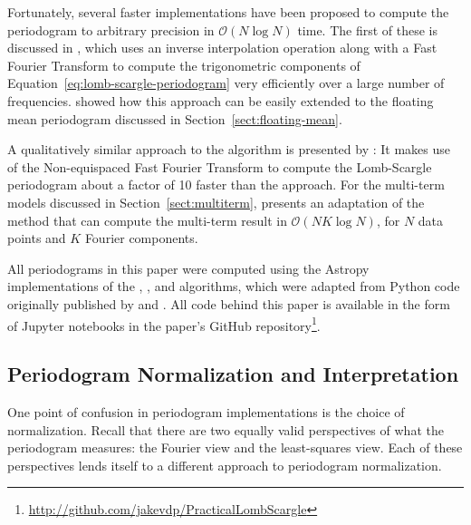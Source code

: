\documentclass[preprint]{aastex}
\newcommand{\Eq}[1]{Equation~\ref{eq:#1}}
\newcommand{\eq}[1]{\Eq{#1}}
\newcommand{\Sect}[1]{Section~\ref{sect:#1}}
\newcommand{\sect}[1]{\Sect{#1}}
\newcommand{\sectlabel}[1]{\label{sect:#1}}
\begin{document}
Fortunately, several faster implementations have been proposed to compute the
periodogram to arbitrary precision in $\mathcal{O}(N\log N)$ time.
The first of these is discussed in \citet{Press89}, which uses an inverse
interpolation operation along with a Fast Fourier Transform to compute the
trigonometric components of \eq{lomb-scargle-periodogram} very efficiently over
a large number of frequencies.
\citet{Zechmeister09} showed how this approach can be easily extended to
the floating mean periodogram discussed in \sect{floating-mean}.

A qualitatively similar approach to the \citet{Press89} algorithm
is presented by \citet{Leroy2012}:
It makes use of the Non-equispaced Fast Fourier Transform
\citep[NFFT, see][]{Keiner2009} to compute the Lomb-Scargle periodogram about
a factor of 10 faster than the \citet{Press89} approach.
For the multi-term models discussed in \sect{multiterm}, \citet{Palmer09}
presents an adaptation of the \citet{Press89} method that can compute the
multi-term result in $\mathcal{O}(NK\log N)$, for $N$ data points and
$K$ Fourier components.

All periodograms in this paper were computed using the Astropy
implementations of the \citet{Press89}, \citet{Zechmeister09}, and
\citet{Palmer09} algorithms, which were adapted from Python code originally
published by \citet{ICVG2014} and \citet{VanderPlas2015}.
All code behind this paper is available in the form of Jupyter notebooks in the
paper's GitHub repository\footnote{\url{http://github.com/jakevdp/PracticalLombScargle}}.


\subsection{Periodogram Normalization and Interpretation}
\sectlabel{normalizations}

One point of confusion in periodogram implementations is the choice of
normalization.
Recall that there are two equally valid perspectives of what the periodogram
measures: the Fourier view and the least-squares view.
Each of these perspectives lends itself to a different approach to
periodogram normalization.
\end{document}
